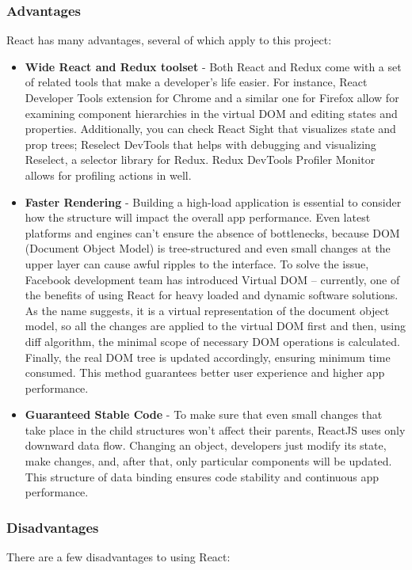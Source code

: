 \subsubsection{Advantages}
React has many advantages, several of which apply to this project:

\begin{itemize}
    \item \textbf{Wide React and Redux toolset} - Both React and Redux come with a set of related tools that make a developer’s life easier. For instance, React Developer Tools extension for Chrome and a similar one for Firefox allow for examining component hierarchies in the virtual DOM and editing states and properties. Additionally, you can check React Sight that visualizes state and prop trees; Reselect DevTools that helps with debugging and visualizing Reselect, a selector library for Redux. Redux DevTools Profiler Monitor allows for profiling actions in well.
    \item \textbf{Faster Rendering} - Building a high-load application is essential to consider how the structure will impact the overall app performance. Even latest platforms and engines can't ensure the absence of bottlenecks, because DOM (Document Object Model) is tree-structured and even small changes at the upper layer can cause awful ripples to the interface. To solve the issue, Facebook development team has introduced Virtual DOM – currently, one of the benefits of using React for heavy loaded and dynamic software solutions. As the name suggests, it is a virtual representation of the document object model, so all the changes are applied to the virtual DOM first and then, using diff algorithm, the minimal scope of necessary DOM operations is calculated. Finally, the real DOM tree is updated accordingly, ensuring minimum time consumed. This method guarantees better user experience and higher app performance.
    \item \textbf{Guaranteed Stable Code} - To make sure that even small changes that take place in the child structures won't affect their parents, ReactJS uses only downward data flow. Changing an object, developers just modify its state, make changes, and, after that, only particular components will be updated. This structure of data binding ensures code stability and continuous app performance.
\end{itemize}

\subsubsection{Disadvantages}
There are a few disadvantages to using React:

